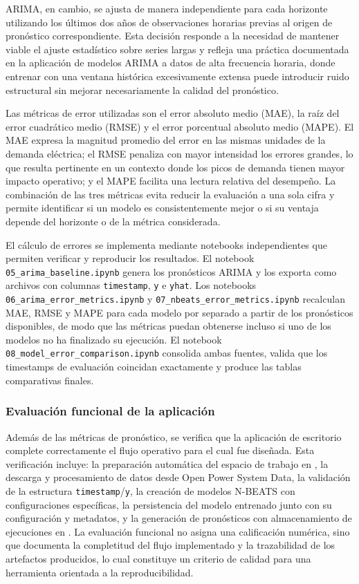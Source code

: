 ARIMA, en cambio, se ajusta de manera independiente para cada horizonte utilizando los últimos dos años de observaciones horarias previas al origen de pronóstico correspondiente. Esta decisión responde a la necesidad de mantener viable el ajuste estadístico sobre series largas y refleja una práctica documentada en la aplicación de modelos ARIMA a datos de alta frecuencia horaria, donde entrenar con una ventana histórica excesivamente extensa puede introducir ruido estructural sin mejorar necesariamente la calidad del pronóstico.

Las métricas de error utilizadas son el error absoluto medio (MAE), la raíz del error cuadrático medio (RMSE) y el error porcentual absoluto medio (MAPE). El MAE expresa la magnitud promedio del error en las mismas unidades de la demanda eléctrica; el RMSE penaliza con mayor intensidad los errores grandes, lo que resulta pertinente en un contexto donde los picos de demanda tienen mayor impacto operativo; y el MAPE facilita una lectura relativa del desempeño. La combinación de las tres métricas evita reducir la evaluación a una sola cifra y permite identificar si un modelo es consistentemente mejor o si su ventaja depende del horizonte o de la métrica considerada.

El cálculo de errores se implementa mediante notebooks independientes que permiten verificar y reproducir los resultados. El notebook \texttt{05\_arima\_baseline.ipynb} genera los pronósticos ARIMA y los exporta como archivos con columnas \texttt{timestamp}, \texttt{y} e \texttt{yhat}. Los notebooks \texttt{06\_arima\_error\_metrics.ipynb} y \texttt{07\_nbeats\_error\_metrics.ipynb} recalculan MAE, RMSE y MAPE para cada modelo por separado a partir de los pronósticos disponibles, de modo que las métricas puedan obtenerse incluso si uno de los modelos no ha finalizado su ejecución. El notebook \texttt{08\_model\_error\_comparison.ipynb} consolida ambas fuentes, valida que los timestamps de evaluación coincidan exactamente y produce las tablas comparativas finales.

\subsubsection{Evaluación funcional de la aplicación}

Además de las métricas de pronóstico, se verifica que la aplicación de escritorio complete correctamente el flujo operativo para el cual fue diseñada. Esta verificación incluye: la preparación automática del espacio de trabajo en , la descarga y procesamiento de datos desde Open Power System Data, la validación de la estructura \texttt{timestamp}/\texttt{y}, la creación de modelos N-BEATS con configuraciones específicas, la persistencia del modelo entrenado junto con su configuración y metadatos, y la generación de pronósticos con almacenamiento de ejecuciones en . La evaluación funcional no asigna una calificación numérica, sino que documenta la completitud del flujo implementado y la trazabilidad de los artefactos producidos, lo cual constituye un criterio de calidad para una herramienta orientada a la reproducibilidad.
